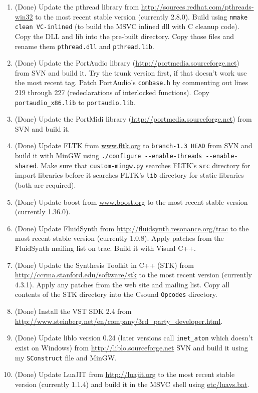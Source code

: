\documentclass[11pt,letterpaper,onecolumn]{scrartcl}
\begin{document}
\begin{sloppypar}
\begin{enumerate}
\begin{enumerate}
	    \item (Done) Update the pthread library from \url{http://sources.redhat.com/pthreads-win32} to the most recent stable version (currently 2.8.0). Build using \texttt{nmake clean VC-inlined} (to build the MSVC inlined dll with C cleanup code). Copy the DLL and lib into the pre-built directory. Copy those files and rename them \texttt{pthread.dll} and \texttt{pthread.lib}.
			\item (Done) Update the PortAudio library (\url{http://portmedia.sourceforge.net}) from SVN and build it. Try the trunk version first, if that doesn't work use the most recent tag. Patch PortAudio's \texttt{combase.h} by commenting out lines 219 through 227 (redeclarations of interlocked functions). Copy \verb|portaudio_x86.lib| to \verb|portaudio.lib|.
			\item (Done) Update the PortMidi library (\url{http://portmedia.sourceforge.net}) from SVN and build it.
    	\item (Done) Update FLTK from \url{www.fltk.org} to \texttt{branch-1.3 HEAD} from SVN and build it with MinGW using \verb|./configure --enable-threads --enable-shared|. Make sure that \texttt{custom-mingw.py} searches FLTK's \texttt{src} directory for import libraries before it searches FLTK's \texttt{lib} directory for static libraries (both are required).
    	\item (Done) Update boost from \url{www.boost.org} to the most recent stable version (currently 1.36.0).
    	\item (Done) Update FluidSynth from \url{http://fluidsynth.resonance.org/trac} to the most recent stable version (currently 1.0.8). Apply patches from the FluidSynth mailing list on trac. Build it with Visual C++.
    	\item (Done) Update the Synthesis Toolkit in C++ (STK) from \url{http://ccrma.stanford.edu/software/stk} to the most recent version (currently 4.3.1). Apply any patches from the web site and mailing list. Copy all contents of the STK directory into the Csound \texttt{Opcodes} directory.
    	\item (Done) Install the VST SDK 2.4 from \url{http://www.steinberg.net/en/company/3rd_party_developer.html}.
    	\item (Done) Update liblo version 0.24 (later versions call \verb|inet_aton| which doesn't exist on Windows) from \url{http://liblo.sourceforge.net} SVN and build it using my \texttt{SConstruct} file and MinGW.
    	\item (Done) Update LuaJIT from \url{http://luajit.org} to the most recent stable version (currently 1.1.4) and build it in the MSVC shell using \url{etc/luavs.bat}.

\end{enumerate}
\end{enumerate}
\end{sloppypar}
\end{document}
